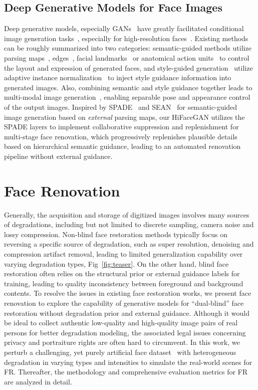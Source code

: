 \documentclass[sigconf]{acmart}
\begin{document}
\subsection{Deep Generative Models for Face Images}

Deep generative models, especially GANs~\cite{gan} have greatly facilitated conditional image generation tasks~\cite{pix2pix}\cite{cyclegan}, especially for high-resolution faces~\cite{progressivegan}\cite{stylegan_ffhq}\cite{stylegan2}. Existing methods can be roughly summarized into two categories: semantic-guided methods utilize parsing maps~\cite{pix2pixHD}, edges~\cite{vid2vid}, facial landmarks~\cite{SuperFAN} or anatomical action units~\cite{GANimation} to control the layout and expression of generated faces, and style-guided generation~\cite{stylegan_ffhq}\cite{stylegan2} utilize adaptive instance normalization~\cite{adain} to inject style guidance information into generated images. Also, combining semantic and style guidance together leads to multi-modal image generation~\cite{bicyclegan}, enabling separable pose and appearance control of the output images. Inspired by SPADE~\cite{spade} and SEAN~\cite{sean} for semantic-guided image generation based on \emph{external} parsing maps, our HiFaceGAN utilizes the SPADE layers to implement collaborative suppression and replenishment for multi-stage face renovation, which progressively replenishes plausible details based on hierarchical semantic guidance, leading to an automated renovation pipeline without external guidance.

\section{Face Renovation}\label{sec:face_renovation}
Generally, the acquisition and storage of digitized images involves many sources of degradations, including but not limited to discrete sampling, camera noise and lossy compression. Non-blind face restoration methods typically focus on reversing a specific source of degradation, such as super resolution, denoising and compression artifact removal, leading to limited generalization capability over varying degradation types, Fig~\ref{fig:teaser}. On the other hand, blind face restoration often relies on the structural prior or external guidance labels for training, leading to quality inconsistency between foreground and background contents.
To resolve the issues in existing face restoration works, we present face renovation to explore the capability of generative models for ``dual-blind'' face restoration without degradation prior and external guidance.
Although it would be ideal to collect authentic low-quality and high-quality image pairs of real persons for better degradation modeling, the associated legal issues concerning privacy and portraiture rights are often hard to circumvent.
In this work, we perturb a challenging, yet purely artificial face dataset~\cite{stylegan_ffhq} with heterogeneous degradation in varying types and intensities to simulate the real-world scenes for FR. Thereafter, the methodology and comprehensive evaluation metrics for FR are analyzed in detail.
\end{document}
